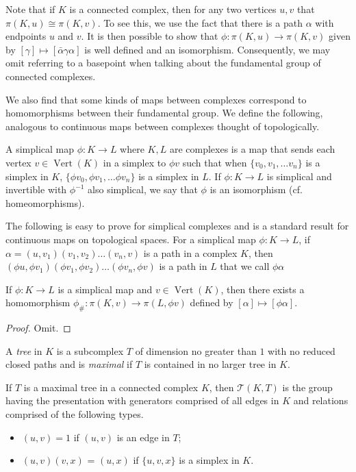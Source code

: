Note that if $K$ is a connected complex, then for any two vertices $u,v$ that $\pi(K,u) \cong \pi(K,v)$. To see this, we use the fact that there is a path $\alpha$ with endpoints $u$ and $v$. It is then possible to show that $\phi : \pi(K,u) \rightarrow \pi(K,v)$ given by $[\gamma] \mapsto [\bar{\alpha} \gamma \alpha]$ is well defined and an isomorphism. 
Consequently, we may omit referring to a basepoint when talking about the fundamental group of connected complexes.

We also find that some kinds of maps between complexes correspond to homomorphisms between their fundamental group. We define the following, analogous to continuous maps between complexes thought of topologically.

\begin{definition}
  A simplical map $\phi:K \rightarrow L$ where $K,L$ are complexes is a map that sends each vertex $v \in \operatorname{Vert}(K)$ in a simplex to $\phi v$ such that when $\{ v_0, v_1, \dots v_n \}$ is a simplex in $K$, $\{\phi v_0, \phi v_1, \dots \phi v_n\}$ is a simplex in $L$. If $\phi:K \rightarrow L$ is simplical and invertible with $\phi^{-1}$ also simplical, we say that $\phi$ is an isomorphism (cf. homeomorphisms).
\end{definition}

The following is easy to prove for simplical complexes and is a standard result for continuous maps on topological spaces. For a simplical map $\phi:K \rightarrow L$, if $\alpha = (u,v_1)(v_1,v_2) \dots (v_n,v)$ is a path in a complex $K$, then $(\phi u,\phi v_1)(\phi v_1,\phi v_2) \dots (\phi v_n,\phi v)$ is a path in $L$ that we call $\phi \alpha$

\begin{theorem}
  If $\phi:K \rightarrow L$ is a simplical map and $v \in \operatorname{Vert}(K)$, then there exists a homomorphism $\phi_{\#}:\pi(K,v) \rightarrow \pi(L,\phi v)$ defined by $[\alpha] \mapsto [\phi \alpha]$.
\end{theorem}

\begin{proof}
Omit.  
\end{proof}

\begin{definition}
  A \emph{tree} in $K$ is a subcomplex $T$ of dimension no greater than $1$ with no reduced closed paths and is \emph{maximal} if $T$ is contained in no larger tree in $K$.
\end{definition}

\begin{definition}
  If $T$ is a maximal tree in a connected complex $K$, then $\mathcal{T}(K,T)$ is the group having the presentation with generators comprised of all edges in $K$ and relations comprised of the following types.
  \begin{itemize}
  \item $(u,v) = 1$ if $(u,v)$ is an edge in $T$;
  \item $(u,v)(v,x)$ = $(u,x)$ if $\{u,v,x \}$ is a simplex in $K$.
  \end{itemize}
\end{definition}

